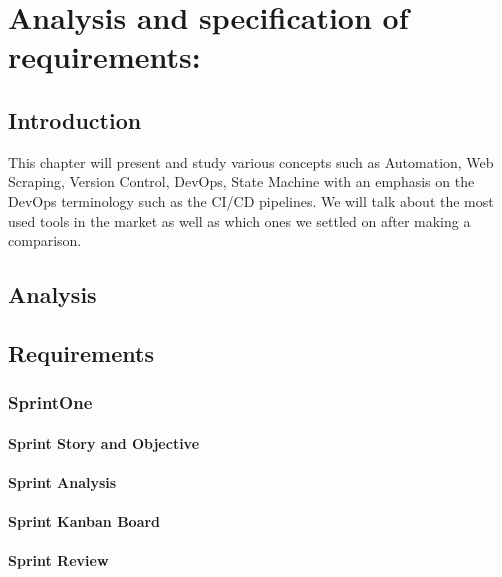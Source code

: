 \chapter{Analysis and specification of requirements:}
\newpage

\setcounter{secnumdepth}{0} %
\section{Introduction}
This chapter will present and study various concepts such as Automation, Web Scraping, Version Control, DevOps, State Machine with an emphasis on the DevOps terminology such as the CI/CD pipelines. We will talk about the most used tools in the market as well as which ones we settled on after making a comparison.

\setcounter{secnumdepth}{2} %
\section{Analysis}

\section{Requirements}
\subsection{SprintOne}
\subsubsection{Sprint Story and Objective}
\subsubsection{Sprint Analysis}
\subsubsection{Sprint Kanban Board}
\subsubsection{Sprint Review}

